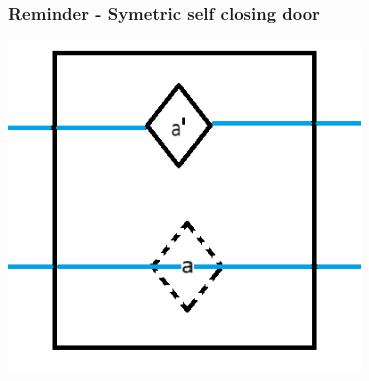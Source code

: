 \documentclass{beamer}
\begin{document}
\begin{frame}
\begin{minipage}[t]{0.49\textwidth}
  \end{minipage}
\end{frame}

\begin{frame}
  \frametitle{Reminder - Symetric self closing door}
  \includegraphics[width=0.7\textwidth]{res/doors/SelfClosingSymetricDoor.png}
\end{frame}
\end{document}
